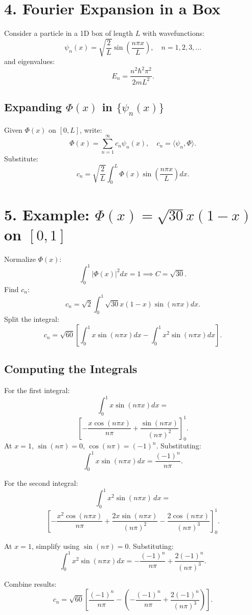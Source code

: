 \documentclass[a4paper,12pt]{article}
\begin{document}
\begin{multicols}{2}
\section*{4. Fourier Expansion in a Box}
Consider a particle in a 1D box of length $L$ with wavefunctions:
\[
\psi_n(x) = \sqrt{\frac{2}{L}} \sin\left(\frac{n\pi x}{L}\right), \quad n = 1, 2, 3, \dots
\]
and eigenvalues:
\[
E_n = \frac{n^2 \hbar^2 \pi^2}{2mL^2}.
\]

\subsection*{Expanding $\Phi(x)$ in $\{\psi_n(x)\}$}
Given $\Phi(x)$ on $[0, L]$, write:
\[
\Phi(x) = \sum_{n=1}^\infty c_n \psi_n(x), \quad c_n = \langle \psi_n, \Phi \rangle.
\]
Substitute:
\[
c_n = \sqrt{\frac{2}{L}} \int_0^L \Phi(x) \sin\left(\frac{n\pi x}{L}\right) dx.
\]

\section*{5. Example: $\Phi(x) = \sqrt{30} x(1-x)$ on $[0,1]$}
Normalize $\Phi(x)$:
\[
\int_0^1 |\Phi(x)|^2 dx = 1 \implies C = \sqrt{30}.
\]
Find $c_n$:
\[
c_n = \sqrt{2} \int_0^1 \sqrt{30} x(1-x) \sin(n\pi x) dx.
\]
Split the integral:
\[
c_n = \sqrt{60} \left[ \int_0^1 x \sin(n\pi x) dx - \int_0^1 x^2 \sin(n\pi x) dx \right].
\]

\subsection*{Computing the Integrals}
For the first integral:
\[
\int_0^1 x \sin(n\pi x) dx =
\]
\[
\left[-\frac{x \cos(n\pi x)}{n\pi} + \frac{\sin(n\pi x)}{(n\pi)^2}\right]_0^1.
\]
At $x=1$, $\sin(n\pi) = 0$, $\cos(n\pi) = (-1)^n$. Substituting:
\[
\int_0^1 x \sin(n\pi x) dx = \frac{(-1)^n}{n\pi}.
\]

For the second integral:
\[
\int_0^1 x^2 \sin(n\pi x) \, dx =
\]
\[
\left[
    -\frac{x^2 \cos(n\pi x)}{n\pi} 
    + \frac{2x \sin(n\pi x)}{(n\pi)^2}
    - \frac{2\cos(n\pi x)}{(n\pi)^3}
\right]_0^1.
\]



At $x=1$, simplify using $\sin(n\pi)=0$. Substituting:
\[
\int_0^1 x^2 \sin(n\pi x) dx = -\frac{(-1)^n}{n\pi} + \frac{2(-1)^n}{(n\pi)^3}.
\]

Combine results:
\[
c_n = \sqrt{60} \left[\frac{(-1)^n}{n\pi} - \left(-\frac{(-1)^n}{n\pi} + \frac{2(-1)^n}{(n\pi)^3}\right)\right].
\]


\end{multicols}
\end{document}
